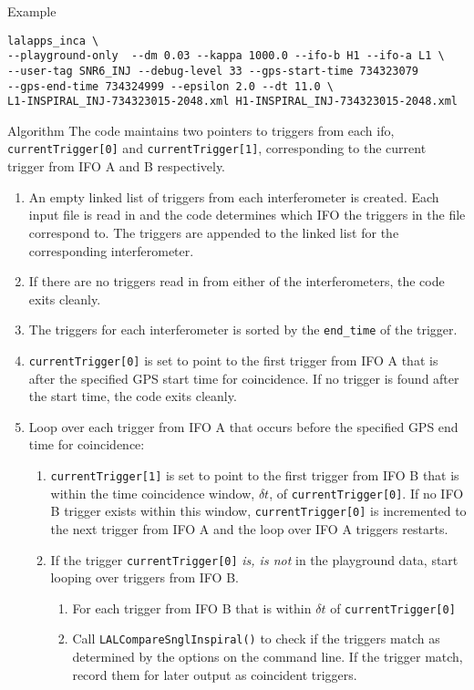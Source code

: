 \begin{entry}
\item[Example]
\begin{verbatim}
lalapps_inca \
--playground-only  --dm 0.03 --kappa 1000.0 --ifo-b H1 --ifo-a L1 \
--user-tag SNR6_INJ --debug-level 33 --gps-start-time 734323079
--gps-end-time 734324999 --epsilon 2.0 --dt 11.0 \
L1-INSPIRAL_INJ-734323015-2048.xml H1-INSPIRAL_INJ-734323015-2048.xml
\end{verbatim}

\item[Algorithm]
The code maintains two pointers to triggers from each ifo,
\texttt{currentTrigger[0]} and \texttt{currentTrigger[1]}, corresponding to
the current trigger from IFO A and B respectively.

\begin{enumerate}
\item An empty linked list of triggers from each interferometer is created.
Each input file is read in and the code determines which IFO the triggers in
the file correspond to. The triggers are appended to the linked list for the
corresponding interferometer.

\item If there are no triggers read in from either of the interferometers,
the code exits cleanly.

\item The triggers for each interferometer is sorted by the \texttt{end\_time}
of the trigger.

\item \texttt{currentTrigger[0]} is set to point to the first trigger from IFO
A that is after the specified GPS start time for coincidence. If no trigger is
found after the start time, the code exits cleanly.

\item Loop over each trigger from IFO A that occurs before the specified GPS
end time for coincidence:
\begin{enumerate}
\item \texttt{currentTrigger[1]} is set to point to the first trigger from IFO
B that is within the time coincidence window, $\delta t$, of
\texttt{currentTrigger[0]}. If no IFO B trigger exists within this window,
\texttt{currentTrigger[0]} is incremented to the next trigger from IFO A and
the loop over IFO A triggers restarts.

\item If the trigger \texttt{currentTrigger[0]} \emph{is, is not} in the
playground data, start looping over triggers from IFO B.
\begin{enumerate}
\item For each trigger from IFO B that is within $\delta t$ of
\texttt{currentTrigger[0]}
\item Call \texttt{LALCompareSnglInspiral()} to check if the triggers match as
determined by the options on the command line. If the trigger match, record
them for later output as coincident triggers.
\end{enumerate}


\end{enumerate}
\end{enumerate}
\end{entry}
